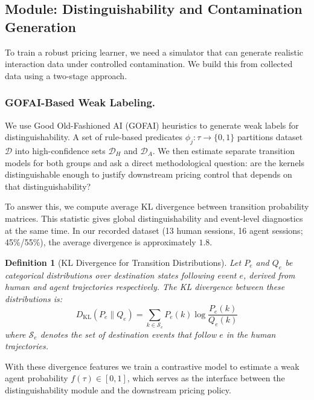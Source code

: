 \documentclass[sigconf]{acmart}
\newtheorem{definition}{Definition}
\begin{document}
\subsection{Module: Distinguishability and Contamination Generation}
\label{sec:distinguishability}

To train a robust pricing learner, we need a simulator that can generate realistic interaction data under controlled contamination. We build this from collected data using a two-stage approach.

\subsubsection{GOFAI-Based Weak Labeling.}
We use Good Old-Fashioned AI (GOFAI) heuristics to generate weak labels for distinguishability. A set of rule-based predicates $\phi_j: \tau \to \{0,1\}$ partitions dataset $\mathcal{D}$ into high-confidence sets $\mathcal{D}_H$ and $\mathcal{D}_A$. We then estimate separate transition models for both groups and ask a direct methodological question: are the kernels distinguishable enough to justify downstream pricing control that depends on that distinguishability?

To answer this, we compute average KL divergence between transition probability matrices. This statistic gives global distinguishability and event-level diagnostics at the same time. In our recorded dataset (13 human sessions, 16 agent sessions; 45\%/55\%), the average divergence is approximately $1.8$.

\begin{definition}[KL Divergence for Transition Distributions]
Let $P_e$ and $Q_e$ be categorical distributions over destination states following event $e$, derived from human and agent trajectories respectively. The KL divergence between these distributions is:
\begin{equation}
  D_{\mathrm{KL}}(P_e \parallel Q_e) = \sum_{k \in \mathcal{S}_e} P_e(k) \log \frac{P_e(k)}{Q_e(k)}
\end{equation}
where $\mathcal{S}_e$ denotes the set of destination events that follow $e$ in the human trajectories.
\end{definition}

With these divergence features we train a contrastive model to estimate a weak agent probability $f(\tau)\in[0,1]$, which serves as the interface between the distinguishability module and the downstream pricing policy.
\end{document}

